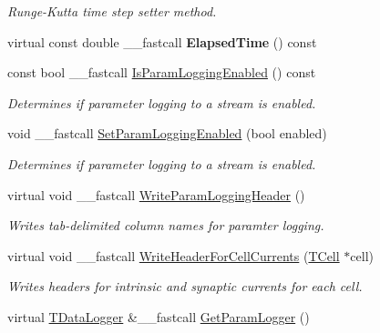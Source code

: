 \begin{DoxyCompactItemize}
\begin{DoxyCompactList}\small\item\em Runge-\/\+Kutta time step setter method. \end{DoxyCompactList}\item 
\hypertarget{class_t_network_a26507c4e11b3c5caf36625f6d5fc92e7}{virtual const double \+\_\+\+\_\+fastcall {\bfseries Elapsed\+Time} () const }\label{class_t_network_a26507c4e11b3c5caf36625f6d5fc92e7}

\item 
\hypertarget{class_t_network_ae89373d91a4136126cb871fd4c541cf0}{const bool \+\_\+\+\_\+fastcall \hyperlink{class_t_network_ae89373d91a4136126cb871fd4c541cf0}{Is\+Param\+Logging\+Enabled} () const }\label{class_t_network_ae89373d91a4136126cb871fd4c541cf0}

\begin{DoxyCompactList}\small\item\em Determines if parameter logging to a stream is enabled. \end{DoxyCompactList}\item 
\hypertarget{class_t_network_a60a220f1d272aec26152ffe4b80a3c64}{void \+\_\+\+\_\+fastcall \hyperlink{class_t_network_a60a220f1d272aec26152ffe4b80a3c64}{Set\+Param\+Logging\+Enabled} (bool enabled)}\label{class_t_network_a60a220f1d272aec26152ffe4b80a3c64}

\begin{DoxyCompactList}\small\item\em Determines if parameter logging to a stream is enabled. \end{DoxyCompactList}\item 
virtual void \+\_\+\+\_\+fastcall \hyperlink{class_t_network_a39e0717cf1e0d0134053871a7199376f}{Write\+Param\+Logging\+Header} ()
\begin{DoxyCompactList}\small\item\em Writes tab-\/delimited column names for paramter logging. \end{DoxyCompactList}\item 
\hypertarget{class_t_network_ac4785621fe020479391e6279a388af22}{virtual void \+\_\+\+\_\+fastcall \hyperlink{class_t_network_ac4785621fe020479391e6279a388af22}{Write\+Header\+For\+Cell\+Currents} (\hyperlink{class_t_cell}{T\+Cell} $\ast$cell)}\label{class_t_network_ac4785621fe020479391e6279a388af22}

\begin{DoxyCompactList}\small\item\em Writes headers for intrinsic and synaptic currents for each cell. \end{DoxyCompactList}\item 
\hypertarget{class_t_network_ac47a2d67ec939b6e0a898cae11af24aa}{virtual \hyperlink{class_t_data_logger}{T\+Data\+Logger} \&\+\_\+\+\_\+fastcall \hyperlink{class_t_network_ac47a2d67ec939b6e0a898cae11af24aa}{Get\+Param\+Logger} ()}\label{class_t_network_ac47a2d67ec939b6e0a898cae11af24aa}


\end{DoxyCompactItemize}
